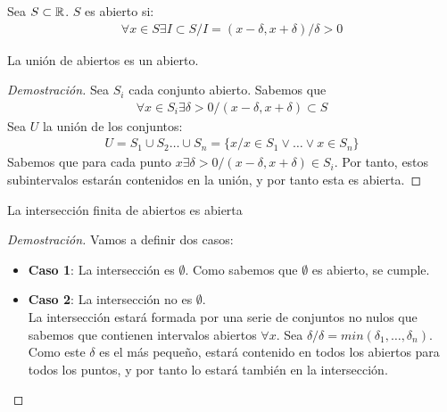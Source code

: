 \documentclass{../Topologia.tex}
\begin{document}
\begin{defin}
	Sea $S \subset \mathbb{R}$. $S$ es abierto si:
	\begin{equation}
		\begin{split}
			\forall x \in S \exists I \subset S / I =
			(x-\delta, x+\delta) / \delta > 0
		\end{split}
	\end{equation}
\end{defin}
\begin{prop}
	La unión de abiertos es un abierto.
\end{prop}
\begin{proof}[Demostración]
	Sea $S_{i}$ cada conjunto abierto. Sabemos que
	\begin{equation}
		\begin{split}
			\forall x \in S_{i} \exists \delta > 0 / (x-\delta, x+\delta) \subset S
		\end{split}
	\end{equation}
	Sea $U$ la unión de los conjuntos:
	\begin{equation}
		\begin{split}
			U = S_{1} \cup S_{2}\dots \cup S_{n} = 
			\{ x / x \in S_{1} \vee \dots \vee x \in S_{n} \}
		\end{split}
	\end{equation}
	Sabemos que para cada punto $x \exists \delta > 0 / (x-\delta,x+\delta) \in S_{i}$.
	Por tanto, estos subintervalos estarán contenidos en la unión, y por tanto
	esta es abierta.
\end{proof}
\begin{prop}
	La intersección finita de abiertos es abierta
\end{prop}
\begin{proof}[Demostración]
	Vamos a definir dos casos:
	\begin{itemize}
		\item \textbf{Caso 1}: La intersección es $\emptyset$. 
		Como sabemos que $\emptyset$ es abierto, se cumple.
		\item \textbf{Caso 2}: La intersección no es $\emptyset$.\\
		La intersección estará formada por una serie de conjuntos no nulos que
		sabemos que contienen intervalos abiertos $\forall x$. Sea $\delta
		 / \delta = min(\delta_{1}, \dots ,\delta_{n})$. Como este $\delta$
		 es el más pequeño, estará contenido en todos los abiertos para
		 todos los puntos, y por tanto lo estará también en la intersección.
	\end{itemize}
\end{proof}
\end{document}
